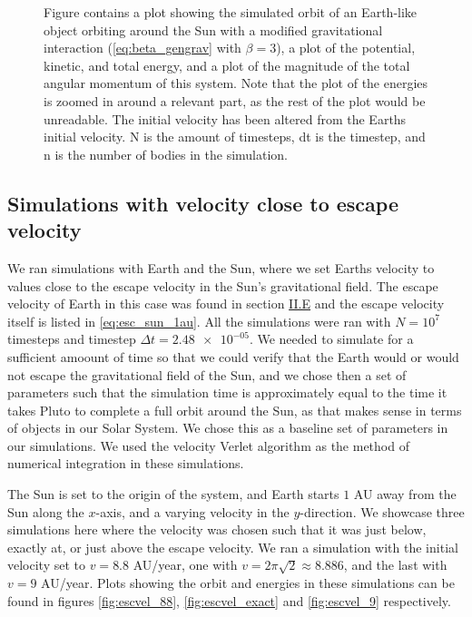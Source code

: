 \documentclass[reprint,english,notitlepage]{revtex4-1}  %
\begin{document}
\begin{figure}[H]
\caption{Figure contains a plot showing the simulated orbit of an Earth-like object orbiting around the Sun with a modified gravitational interaction (\eqref{eq:beta_gengrav} with $\beta = 3$), a plot of the potential, kinetic, and total energy, and a plot of the magnitude of the total angular momentum of this system. Note that the plot of the energies is zoomed in around a relevant part, as the rest of the plot would be unreadable. The initial velocity has been altered from the Earths initial velocity. N is the amount of timesteps, dt is the timestep, and n is the number of bodies in the simulation.}
\label{fig:beta3_peturbed}
\end{figure}


\subsection{Simulations with velocity close to escape velocity} \label{sec:IV:d}

We ran simulations with Earth and the Sun, where we set Earths velocity to values close to the escape velocity in the Sun's gravitational field. The escape velocity of Earth in this case was found in section \hyperref[sec:II:e]{II.E} and the escape velocity itself is listed in \eqref{eq:esc_sun_1au}. All the simulations were ran with $N = 10^7$ timesteps and timestep $\Delta t = \num{2.48e-05}$. We needed to simulate for a sufficient amoount of time so that we could verify that the Earth would or would not escape the gravitational field of the Sun, and we chose then a set of parameters such that the simulation time is approximately equal to the time it takes Pluto to complete a full orbit around the Sun, as that makes sense in terms of objects in our Solar System. We chose this as a baseline set of parameters in our simulations. We used the velocity Verlet algorithm as the method of numerical integration in these simulations.

The Sun is set to the origin of the system, and Earth starts $1$ AU away from the Sun along the $x$-axis, and a varying velocity in the $y$-direction. We showcase three simulations here where the velocity was chosen such that it was just below, exactly at, or just above the escape velocity. We ran a simulation with the initial velocity set to $v = 8.8$ AU/year, one with $v = 2\pi \sqrt{2} \approx 8.886$, and the last with $v = 9$ AU/year. Plots showing the orbit and energies in these simulations can be found in figures \ref{fig:escvel_88}, \ref{fig:escvel_exact} and \ref{fig:escvel_9} respectively.
\end{document}
